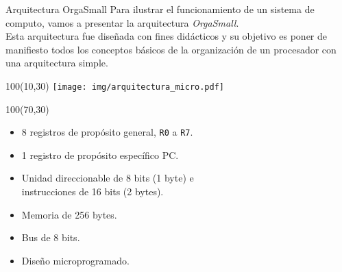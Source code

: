 \documentclass[aspectratio=169]{beamer}
\begin{document}
\begin{frame}[fragile,t]{Arquitectura OrgaSmall}
    \small
    Para ilustrar el funcionamiento de un sistema de computo, vamos a presentar la arquitectura \emph{OrgaSmall}.\\
    \vspace{0.2cm}
    Esta arquitectura fue diseñada con fines didácticos y su objetivo es poner de manifiesto todos los conceptos básicos de la organización de un procesador con una arquitectura simple.\\
    \bigskip    
    \begin{textblock}{100}(10,30)
    \texttt{[image: img/arquitectura\_micro.pdf]}
    \end{textblock}
    \begin{textblock}{100}(70,30)
    \begin{itemize}
    \item 8 registros de propósito general, \texttt{R0} a \texttt{R7}.
    \item 1 registro de propósito específico PC.
    \item Unidad direccionable de 8 bits (1 byte) e \\ instrucciones de 16 bits (2 bytes).
    \item Memoria de 256 bytes.
    \item Bus de 8 bits.
    \item Diseño microprogramado.
    \end{itemize}
    \end{textblock}
\end{frame}
\end{document}
